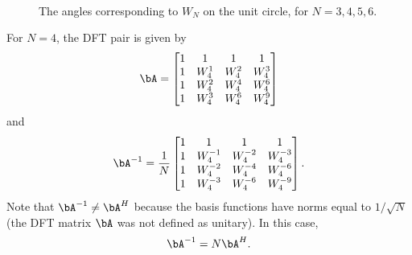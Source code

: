 
\begin{figure}[!htb]
  \begin{center}
    \\
  \end{center}
  \caption{The angles corresponding to $W_N$ on the unit circle, for $N=3,4,5,6$.\label{fig:circledivided}}  
\end{figure}

For $N=4$, the DFT pair is given by
\begin{equation}
\bA = 
    \begin{bmatrix}
    1 & 1 & 1 & 1\\
    1 & W_4^{1} & W_4^{2} & W_4^{3} \\
    1 & W_4^{2} & W_4^{4} & W_4^{6} \\
    1 & W_4^{3} & W_4^{6} & W_4^{9} \\
    \end{bmatrix}
\label{eq:4point_dft}
\end{equation}
and
\[\bA^{-1} = \frac{1}{N}
    \begin{bmatrix}
    1 & 1 & 1 & 1\\
    1 & W_4^{-1} & W_4^{-2} & W_4^{-3} \\
    1 & W_4^{-2} & W_4^{-4} & W_4^{-6} \\
    1 & W_4^{-3} & W_4^{-6} & W_4^{-9} \\
    \end{bmatrix}
.\]
Note that $\bA^{-1} \ne \bA^H$ because the basis functions have norms equal to $1/\sqrt{N}$ (the DFT matrix $\bA$ was not defined as unitary). In this case, 
\begin{equation}
\bA^{-1} = N \bA^H.
\label{eq:dfts_relation_nonorthogonal}
\end{equation}

